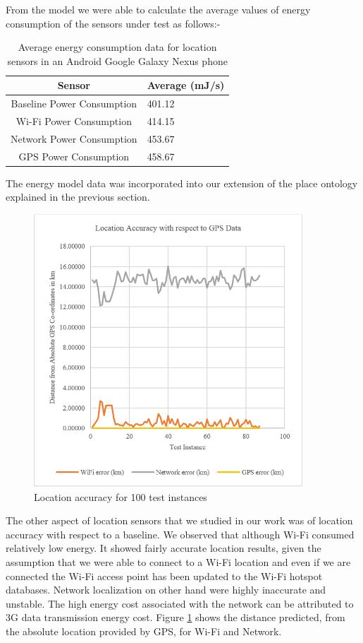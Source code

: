 \documentclass{ubicomp2013}
\begin{document}
From the model we were able to calculate the average values of energy consumption of the sensors under test as follows:-

\begin{table}
\centering
\caption{Average energy consumption data for location sensors in an Android Google Galaxy Nexus phone}
\begin{tabular}{|c|l|} \hline
Sensor&Average (mJ/s)\\ \hline
Baseline Power Consumption&401.12\\ \hline
Wi-Fi Power Consumption&414.15\\ \hline
Network Power Consumption&453.67\\ \hline
GPS Power Consumption&458.67\\ \hline
\hline\end{tabular}
\end{table}

The energy model data was incorporated into our extension of the place ontology explained in the previous section.

\begin{figure}[tbh]
\centering
\includegraphics[width=0.9\textwidth]{Accuracy.png}
\caption{Location accuracy for 100 test instances}
\label{fig:accuracy}
\end{figure}

The other aspect of location sensors that we studied in our work was of location accuracy with respect to a baseline. We observed that although Wi-Fi consumed relatively low energy. It showed fairly accurate location results, given the assumption that we were able to connect to a Wi-Fi location and even if we are connected the Wi-Fi access point has been updated to the Wi-Fi hotspot databases. Network localization on other hand were highly inaccurate and unstable. The high energy cost associated with the network can be attributed to 3G data transmission energy cost. Figure \ref{fig:accuracy} shows the distance predicted, from the absolute location provided by GPS, for Wi-Fi and Network.
\end{document}
